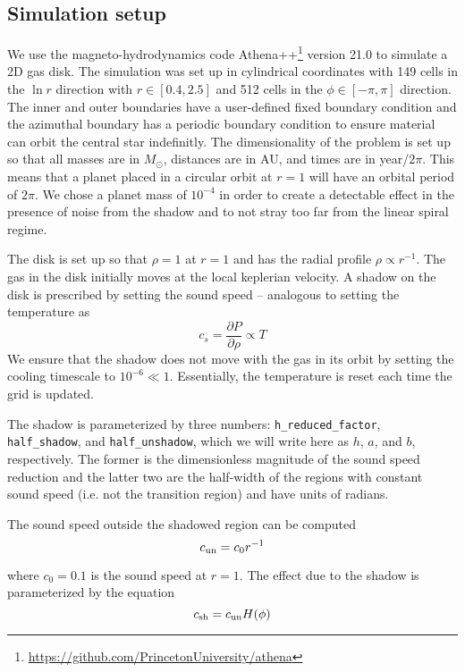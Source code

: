 \documentclass[twocolumn]{aastex631}
\begin{document}
\subsection{Simulation setup}
\label{subsec:setup}
We use the magneto-hydrodynamics code Athena++\footnote{\url{https://github.com/PrincetonUniversity/athena}} 
\citep{stone2020} version 21.0 \citep{athena++developmentteam2021} to simulate a 2D gas disk. The simulation was set up in cylindrical coordinates with 149
cells in the $\ln{r}$ direction with $r \in [0.4, 2.5]$ and 512 cells in the $\phi \in [-\pi, \pi]$ direction. The inner and outer boundaries have a user-defined fixed boundary
condition and the azimuthal boundary has a periodic boundary condition to ensure material can orbit the central star indefinitly. The dimensionality of the problem
is set up so that all masses are in $M_\odot$, distances are in AU, and times are in year/$2\pi$. This means that a planet placed in a circular orbit at $r=1$
will have an orbital period of $2\pi$. We chose a planet mass of $10^{-4}$ in order to create a detectable effect in the presence of noise from the shadow and
to not stray too far from the linear spiral regime.

The disk is set up so that $\rho = 1$ at $r=1$ and has the radial profile $\rho \propto r^{-1}$. The gas in the disk initially moves at the local keplerian velocity.
A shadow on the disk is prescribed by setting the sound speed -- analogous to setting the temperature as 
\begin{equation}
    c_s = \frac{\partial P}{\partial \rho} \propto T
\end{equation}
We ensure that the shadow does not move with the gas in its orbit by setting the cooling timescale to $10^{-6} \ll 1$. Essentially, the temperature is reset each time
the grid is updated.

The shadow is parameterized by three numbers: \texttt{h\_reduced\_factor}, \texttt{half\_shadow}, and \texttt{half\_unshadow},
which we will write here as $h$, $a$, and $b$, respectively. The former is the dimensionless magnitude of the sound speed reduction
and the latter two are the half-width of the regions with constant sound speed (i.e. not the transition region) and have
units of radians.

The sound speed outside the shadowed region can be computed
\begin{equation}
    c_{\rm un} = c_0 r^{-1}
\end{equation}

where $c_0 = 0.1$ is the sound speed at $r=1$. The effect due to the shadow is parameterized by the equation
\begin{equation}
    c_{\rm sh} = c_{\rm un} H(\phi)
\end{equation}
\end{document}
